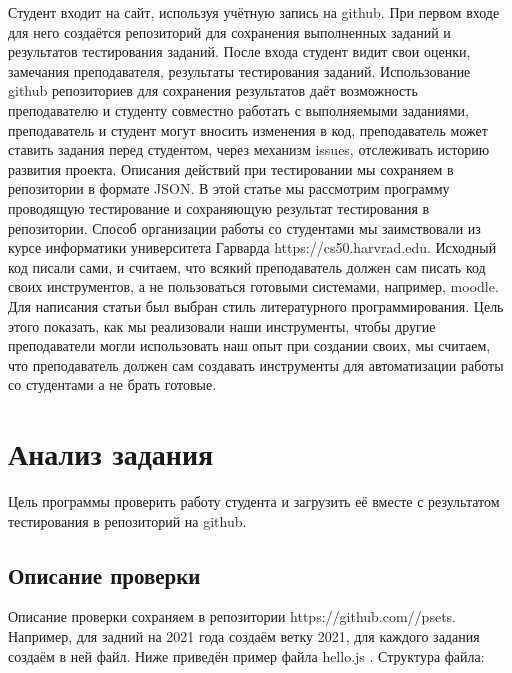 \maketitle%
Студент входит на сайт, используя учётную запись на github.
При первом входе для него создаётся репозиторий
для сохранения выполненных заданий и  результатов
тестирования заданий. После входа студент видит свои оценки, 
замечания преподавателя, результаты тестирования заданий.
Использование github репозиториев для сохранения результатов
даёт возможность преподавателю и студенту совместно работать с
выполняемыми заданиями, преподаватель и студент могут вносить изменения в
код, преподаватель может ставить задания перед студентом, через механизм issues, 
отслеживать историю развития проекта.
Описания действий при тестировании мы сохраняем 
в репозитории в формате JSON. 
В этой статье мы рассмотрим программу проводящую тестирование
и сохраняющую результат тестирования в репозитории.
Способ организации работы со студентами мы заимствовали 
из курсе информатики университета Гарварда https://cs50.harvrad.edu.  
Исходный код писали сами, и считаем, что всякий преподаватель
должен сам писать код своих инструментов, а не пользоваться готовыми
системами, например, moodle. Для написания статьи был выбран стиль
литературного программирования. Цель этого показать, как мы 
реализовали наши инструменты, чтобы другие преподаватели
могли использовать наш опыт при создании своих, 
мы считаем, что преподаватель должен сам создавать
инструменты для автоматизации работы со студентами а не брать готовые. 

\section{Анализ задания}
Цель программы проверить работу студента и загрузить её
вместе с результатом тестирования в репозиторий на github. 

\subsection{Описание проверки}
Описание проверки сохраняем в репозитории 
{\Tt{}https://github.com/{\nwlbrace}/psets\nwendquote}.
Например, для задний на 2021 года создаём ветку 2021,
для каждого задания создаём в ней файл. Ниже приведён 
пример файла {\Tt{}hello.js\nwendquote} .
Структура файла:

